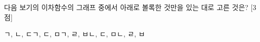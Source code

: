 다음 보기의 이차함수의 그래프 중에서 아래로 볼록한 것만을 있는 대로 고른 것은? \mbox{[3점]} 
\begin{choices32}{ㄱ, ㄴ, ㄷ}{ㄱ, ㄷ, ㅁ}{ㄱ, ㄹ, ㅂ}{ㄴ, ㄷ, ㅁ}{ㄴ, ㄹ, ㅂ}\end{choices32}
